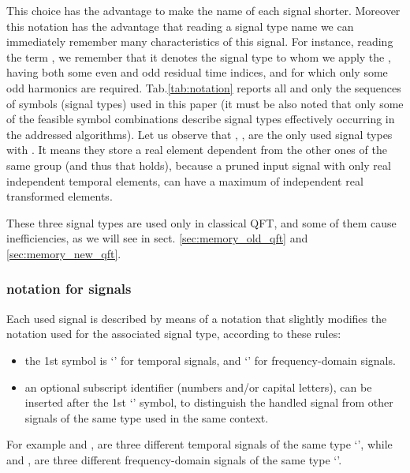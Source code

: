 \documentclass[a4paper,10pt]{article}
\begin{document}
This choice has the advantage to make the name of each signal shorter.
Moreover this notation has the advantage that reading a signal type name we can immediately remember many characteristics of this signal.
For instance, reading the term , we remember that it denotes the signal type to whom we apply the , having both some even and odd residual time  indices, and for which only some odd  harmonics are required.
Tab.\ref{tab:notation} reports all and only the sequences of symbols (signal types) used in this paper (it must be also noted that only some of the feasible symbol combinations describe signal types effectively occurring in the addressed algorithms). 
Let us observe that , ,  are the only used signal types with .
It means they store a real  element dependent from the other ones of the same  group (and thus that  holds), because a pruned input signal with only  real independent temporal elements, can have a maximum of  independent real transformed elements.

These three signal types are used only in classical QFT, and some of them cause inefficiencies, as we will see in sect. \ref{sec:memory_old_qft} and \ref{sec:memory_new_qft}.



\subsubsection{notation for signals} \label{sec:notation_sub_2}

Each used signal is described by means of a notation that slightly modifies the notation used for the associated signal type, according to these rules:
\begin{itemize}
\item 
the 1st symbol is `' for temporal signals, and `' for frequency-domain signals.

\item
an optional subscript identifier (numbers and/or capital letters), can be inserted after the 1st `' symbol, to distinguish the handled signal from other signals of the same type used in the same context.

\end{itemize}
For example  and ,  are three different temporal signals of the same type `', while  and ,  are three different frequency-domain signals of the same type `'.
\end{document}
